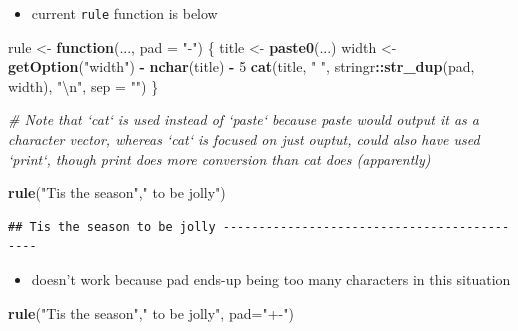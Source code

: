 \documentclass[]{book}
\newenvironment{Shaded}{\begin{snugshade}}{\end{snugshade}}
\newcommand{\CharTok}[1]{\textcolor[rgb]{0.31,0.60,0.02}{#1}}
\newcommand{\CommentTok}[1]{\textcolor[rgb]{0.56,0.35,0.01}{\textit{#1}}}
\newcommand{\ControlFlowTok}[1]{\textcolor[rgb]{0.13,0.29,0.53}{\textbf{#1}}}
\newcommand{\DataTypeTok}[1]{\textcolor[rgb]{0.13,0.29,0.53}{#1}}
\newcommand{\DecValTok}[1]{\textcolor[rgb]{0.00,0.00,0.81}{#1}}
\newcommand{\KeywordTok}[1]{\textcolor[rgb]{0.13,0.29,0.53}{\textbf{#1}}}
\newcommand{\NormalTok}[1]{#1}
\newcommand{\OperatorTok}[1]{\textcolor[rgb]{0.81,0.36,0.00}{\textbf{#1}}}
\newcommand{\StringTok}[1]{\textcolor[rgb]{0.31,0.60,0.02}{#1}}
\providecommand{\tightlist}{%
  \setlength{\itemsep}{0pt}\setlength{\parskip}{0pt}}
\theoremstyle{definition}
\theoremstyle{definition}
\theoremstyle{definition}
\theoremstyle{remark}
\begin{document}
\begin{enumerate}
  \begin{itemize}
  \tightlist
  \item
    current \texttt{rule} function is below
  \end{itemize}

\begin{Shaded}
\begin{Highlighting}[]
\NormalTok{rule <-}\StringTok{ }\ControlFlowTok{function}\NormalTok{(..., }\DataTypeTok{pad =} \StringTok{"-"}\NormalTok{) \{}
\NormalTok{  title <-}\StringTok{ }\KeywordTok{paste0}\NormalTok{(...)}
\NormalTok{  width <-}\StringTok{ }\KeywordTok{getOption}\NormalTok{(}\StringTok{"width"}\NormalTok{) }\OperatorTok{-}\StringTok{ }\KeywordTok{nchar}\NormalTok{(title) }\OperatorTok{-}\StringTok{ }\DecValTok{5}
  \KeywordTok{cat}\NormalTok{(title, }\StringTok{" "}\NormalTok{, stringr}\OperatorTok{::}\KeywordTok{str_dup}\NormalTok{(pad, width), }\StringTok{"}\CharTok{\textbackslash{}n}\StringTok{"}\NormalTok{, }\DataTypeTok{sep =} \StringTok{""}\NormalTok{)}
\NormalTok{\}}

\CommentTok{# Note that `cat` is used instead of `paste` because paste would output it as a character vector, whereas `cat` is focused on just ouptut, could also have used `print`, though print does more conversion than cat does (apparently)}

\KeywordTok{rule}\NormalTok{(}\StringTok{"Tis the season"}\NormalTok{,}\StringTok{" to be jolly"}\NormalTok{)}
\end{Highlighting}
\end{Shaded}

\begin{verbatim}
## Tis the season to be jolly --------------------------------------------
\end{verbatim}

  \begin{itemize}
  \tightlist
  \item
    doesn't work because pad ends-up being too many characters in this
    situation
  \end{itemize}

\begin{Shaded}
\begin{Highlighting}[]
\KeywordTok{rule}\NormalTok{(}\StringTok{"Tis the season"}\NormalTok{,}\StringTok{" to be jolly"}\NormalTok{, }\DataTypeTok{pad=}\StringTok{"+-"}\NormalTok{)}
\end{Highlighting}
\end{Shaded}


\end{enumerate}
\end{document}
